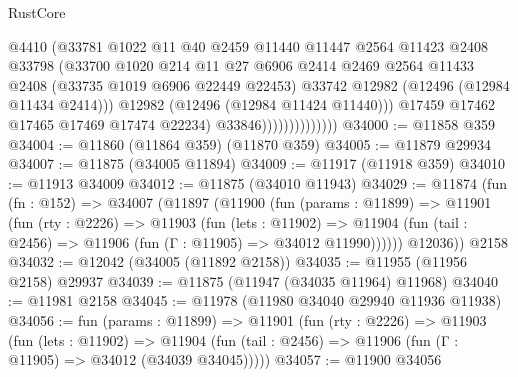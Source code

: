 \begin{lexlean}{RustCore}
\begin{coremodule}
                                  @4410
                                  (@33781
                                    @1022
                                    @11
                                    @40
                                    @2459
                                    @11440
                                    @11447
                                    @2564
                                    @11423
                                    @2408
                                    @33798
                                    (@33700
                                      @1020
                                      @214
                                      @11
                                      @27
                                      @6906
                                      @2414
                                      @2469
                                      @2564
                                      @11433
                                      @2408
                                      (@33735 @1019 @6906 @22449 @22453)
                                      @33742
                                      @12982
                                      (@12496 (@12984 @11434 @2414)))
                                    @12982
                                    (@12496 (@12984 @11424 @11440)))
                                  @17459
                                  @17462
                                  @17465
                                  @17469
                                  @17474
                                  @22234)
                                @33846))))))))))))))
@34000 := @11858 @359
@34004 := @11860 (@11864 @359) (@11870 @359)
@34005 := @11879 @29934
@34007 := @11875 (@34005 @11894)
@34009 := @11917 (@11918 @359)
@34010 := @11913 @34009
@34012 := @11875 (@34010 @11943)
@34029 := @11874
    (fun (fn : @152) =>
    @34007
      (@11897
        (@11900
          (fun (params : @11899) =>
          @11901
            (fun (rty : @2226) =>
            @11903
              (fun (lets : @11902) =>
              @11904 (fun (tail : @2456) => @11906 (fun (Γ : @11905) => @34012 @11990))))))
        @12036))
    @2158
@34032 := @12042 (@34005 (@11892 @2158))
@34035 := @11955 (@11956 @2158) @29937
@34039 := @11875 (@11947 (@34035 @11964) @11968)
@34040 := @11981 @2158
@34045 := @11978 (@11980 @34040 @29940 @11936 @11938)
@34056 := fun (params : @11899) =>
  @11901
    (fun (rty : @2226) =>
    @11903
      (fun (lets : @11902) =>
      @11904 (fun (tail : @2456) => @11906 (fun (Γ : @11905) => @34012 (@34039 @34045)))))
@34057 := @11900 @34056

\end{coremodule}
\end{lexlean}
